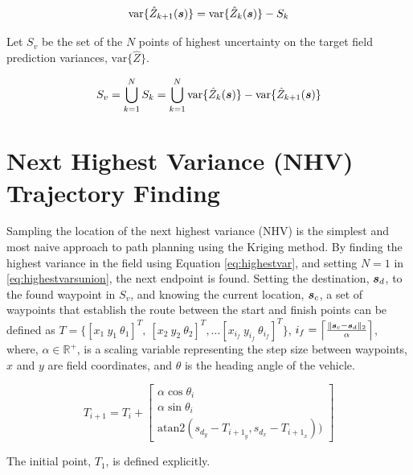 \begin{equation}
	\text{var}\{\hat{Z}_{k+1}({\it{\boldsymbol{s}}})\} = \text{var}\{\hat{Z}_k({\it{\boldsymbol{s}}})\} - S_k \\
	\label{eq:nextmaxvarsset}
\end{equation}

\noindent Let $S_{v}$ be the set of the $N$ points of highest uncertainty on the target field prediction variances, $\text{var}\{\hat{Z}\}$.

\begin{equation}
	\label{eq:highestvarsunion}
	S_{v} = \bigcup_{k = 1}^{N} S_k = \bigcup_{k = 1}^{N} \text{var}\{\hat{Z}_k({\it{\boldsymbol{s}}})\} - \text{var}\{\hat{Z}_{k+1}({\it{\boldsymbol{s}}})\}
\end{equation}

\section{Next Highest Variance (NHV) Trajectory Finding} \label{sec:nhvtrajfind}
Sampling the location of the next highest variance (NHV) is the simplest and most naive approach to path planning using the Kriging method. By finding the highest variance in the field using Equation \ref{eq:highestvar}, and setting $N=1$ in \ref{eq:highestvarsunion}, the next endpoint is found. Setting the destination, ${\it{\boldsymbol{s}}}_d$, to the found waypoint in $S_{v}$, and knowing the current location, ${\it{\boldsymbol{s}}}_{c}$, a set of waypoints that establish the route between the start and finish points can be defined as $T = \Big\{[x_{1}\ y_{1}\ \theta_{1}]^T,\ [x_{2}\ y_{2}\ \theta_{2}]^T, \dots [x_{{i_f}}\ y_{{i_f}}\ \theta_{{i_f}}]^T \Big\}$, $i_f = \Big\lceil \frac{\|{\it{\boldsymbol{s}}}_c - {\it{\boldsymbol{s}}}_d\|_2}{\alpha} \Big\rceil$, where, $\alpha \in \mathbb{R}^{+}$, is a scaling variable representing the step size between waypoints, $x$ and $y$ are field coordinates, and $\theta$ is the heading angle of the vehicle. 

\begin{equation}
	\label{eq:nhvtrajectory}
	T_{{i + 1}} = T_{i} +
	\begin{bmatrix}
		\alpha \cos \theta_{i} \\
		\alpha \sin \theta_{i} \\
		\text{atan2}(s_{d_y} - T_{{{i+1}_y}}, s_{d_x} - T_{{{i+1}_x}}))
	\end{bmatrix}
\end{equation}

\noindent The initial point, $T_{1}$, is defined explicitly.

